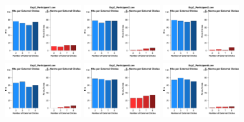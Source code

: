 




\begin{figure}[th]
\centering
\includegraphics[width=0.30\textwidth]{Figures/Numero_Exp2_P1} \includegraphics[width=0.30\textwidth]{Figures/Numero_Exp2_P2} \includegraphics[width=0.30\textwidth]{Figures/Numero_Exp2_P3}
\includegraphics[width=0.30\textwidth]{Figures/Numero_Exp2_P4} \includegraphics[width=0.30\textwidth]{Figures/Numero_Exp2_P5} \includegraphics[width=0.30\textwidth]{Figures/Numero_Exp2_P6}

\end{figure}
